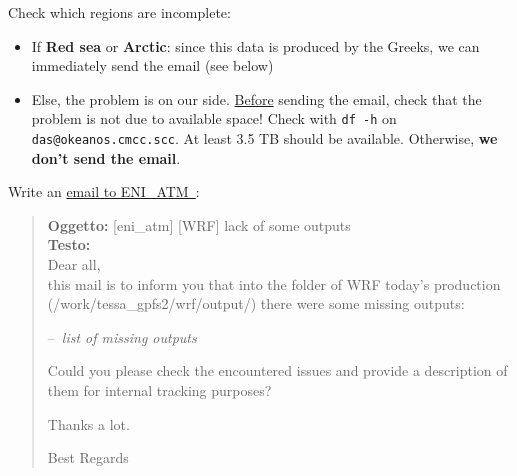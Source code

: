 \documentclass[twocolumn,8pt]{article}
\begin{document}
\begin{mdframed}[frametitle=(Recover B)\ -- Before 10 am]

Check which regions are incomplete:

\begin{itemize}\itemsep0pt
    \item If \textbf{Red sea} or \textbf{Arctic}: since this data is produced by the Greeks, we can immediately send the email (see below)
    \item Else, the problem is on our side. \ul{Before} sending the email, check that the problem is not due to available space! Check with \texttt{df -h} on \texttt{das@okeanos.cmcc.scc}. At least 3.5 TB should be available. Otherwise, \textbf{we don't send the email}.
\end{itemize}

Write an \href{mailto:eni_atm@cmcc.it}{email to ENI\_ATM\ \faEnvelope}:


\begin{quote}
\textbf{Oggetto: }[eni\_atm] [WRF] lack of some outputs\\
\textbf{Testo:}\\
Dear all, \\
this mail is to inform you that into the folder of WRF today's production (/work/tessa\_gpfs2/wrf/output/) there were some missing outputs:

--\ \textit{list of missing outputs}

Could you please check the encountered issues and provide a description of them for internal tracking purposes?


Thanks a lot.

Best Regards
\end{quote}
\end{mdframed}
 
\end{document}
